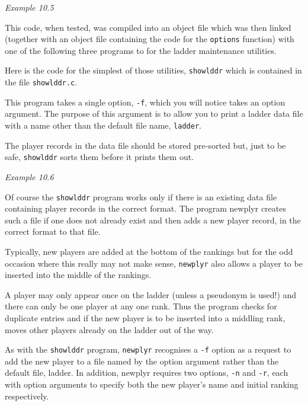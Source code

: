   \begin{center}\textit{Example 10.5}\end{center}


  This code, when tested, was compiled into an object file which was then
   linked (together with an object file containing the code for the
   \texttt{options} function) with one of the following three programs to
   for the ladder maintenance utilities.


  Here is the code for the simplest of those utilities,
   \texttt{showlddr} which is contained in the file
   \texttt{showlddr.c}.


  This program takes a single option, \texttt{-f}, which you will notice
   takes an option argument. The purpose of this argument is to allow you to
   print a ladder data file with a name other than the default file name,
   \texttt{ladder}.


  The player records in the data file should be stored pre-sorted but, just
   to be safe, \texttt{showlddr} sorts them before it prints them out.


  \begin{center}\textit{Example 10.6}\end{center}


  Of course the \texttt{showlddr} program works only if there is an
   existing data file containing player records in the correct format. The
   program newplyr creates such a file if one does not already exist and then
   adds a new player record, in the correct format to that file.


  Typically, new players are added at the bottom of the rankings but for the
   odd occasion where this really may not make sense, \texttt{newplyr} also
   allows a player to be inserted into the middle of the rankings.


  A player may only appear once on the ladder (unless a pseudonym is used!)
   and there can only be one player at any one rank. Thus the program checks
   for duplicate entries and if the new player is to be inserted into
   a middling rank, moves other players already on the ladder out of the
   way.


  As with the \texttt{showlddr} program, \texttt{newplyr} recognises
   a \texttt{-f} option as a request to add the new player to a file named
   by the option argument rather than the default file, ladder. In addition,
   newplyr requires two options, \texttt{-n} and \texttt{-r}, each with
   option arguments to specify both the new player's name and initial ranking
   respectively.


